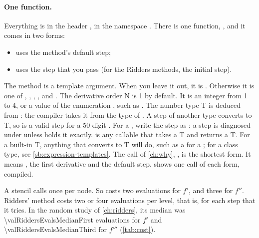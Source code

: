 \paragraph{One function.} Everything is in the header , in the namespace
. There is one function, , and it comes in two forms:
\begin{itemize}
  \item {} uses the method's default step;
  \item {} uses the step  that you pass (for the Ridders methods, the initial
    step).
\end{itemize}
The method  is a template argument. When you leave it out, it is . Otherwise it is one of
, , , ,  and
. The derivative order N is 1 by default. It is an integer from 1 to 4, or a value of the enumeration , such as
. The number type T is deduced from : the compiler takes it from the type of . A
step of another type converts to T, so  is a valid step for a 50-digit . For a 
, write the step as : a  step is diagnosed under  unless
 holds it exactly.  is any callable that takes a T and returns
a T. For a built-in T, anything that converts to T will do, such as a  for a ; for a class
type, see \cref{sb:expression-templates}. The call of \cref{ch:why}, , is the shortest
form. It means , the first derivative and the default step.  shows one call
of each form, compiled.

A stencil calls  once per node. So  costs two evaluations for $f'$, and three for $f''$.
Ridders' method costs two or four evaluations per level, that is, for each step that it tries. In the random study
of \cref{ch:ridders}, its median was \num{\valRiddersEvalsMedianFirst} evaluations for $f'$ and
\num{\valRiddersEvalsMedianThird} for $f'''$ (\cref{tab:cost}).

